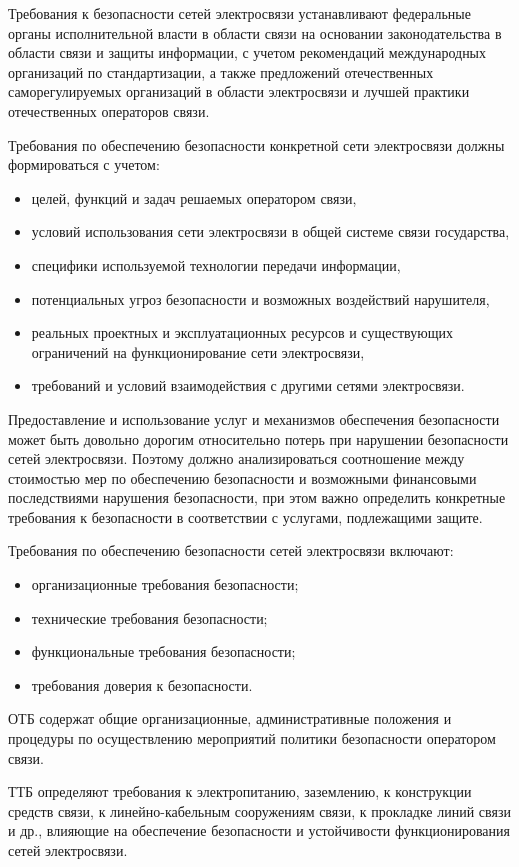 \documentclass[12pt, russian, oneside, article]{ncc}
\begin{document}
Требования к безопасности сетей электросвязи устанавливают федеральные органы исполнительной власти в области связи на основании законодательства в области связи и защиты информации, с учетом рекомендаций международных организаций по стандартизации, а также предложений отечественных саморегулируемых организаций в области электросвязи и лучшей практики отечественных операторов связи.

Требования по обеспечению безопасности конкретной сети электросвязи должны формироваться с учетом:
\begin{itemize}
\item целей, функций и задач решаемых оператором связи,
\item условий использования сети электросвязи в общей системе связи государства,
\item специфики используемой технологии передачи информации,
\item потенциальных угроз безопасности и возможных воздействий нарушителя,
\item реальных проектных и эксплуатационных ресурсов и существующих ограничений на функционирование сети электросвязи,
\item требований и условий взаимодействия с другими сетями электросвязи.
\end{itemize}

Предоставление и использование услуг и механизмов обеспечения безопасности может быть довольно дорогим относительно потерь при нарушении безопасности сетей электросвязи. Поэтому должно анализироваться соотношение между стоимостью мер по обеспечению безопасности и возможными финансовыми последствиями нарушения безопасности, при этом важно определить конкретные требования к безопасности в соответствии с услугами, подлежащими защите.

Требования по обеспечению безопасности сетей электросвязи включают:
\begin{itemize}
\item организационные требования безопасности;
\item технические требования безопасности;
\item функциональные требования безопасности;
\item требования доверия к безопасности.
\end{itemize}

ОТБ содержат общие организационные, административные положения и процедуры по осуществлению мероприятий политики безопасности оператором связи.

ТТБ определяют требования к электропитанию, заземлению, к конструкции средств связи, к линейно-кабельным сооружениям связи, к прокладке линий связи и др., влияющие на обеспечение безопасности и устойчивости функционирования сетей электросвязи.
\end{document}
